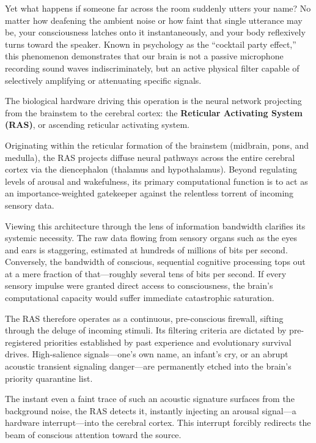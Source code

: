 Yet what happens if someone far across the room suddenly utters your name?
No matter how deafening the ambient noise or how faint that single utterance may be, your consciousness latches onto it instantaneously, and your body reflexively turns toward the speaker.
Known in psychology as the ``cocktail party effect,'' this phenomenon demonstrates that our brain is not a passive microphone recording sound waves indiscriminately, but an active physical filter capable of selectively amplifying or attenuating specific signals.

The biological hardware driving this operation is the neural network projecting from the brainstem to the cerebral cortex: the \textbf{Reticular Activating System (RAS)}, or ascending reticular activating system.

Originating within the reticular formation of the brainstem (midbrain, pons, and medulla), the RAS projects diffuse neural pathways across the entire cerebral cortex via the diencephalon (thalamus and hypothalamus).
Beyond regulating levels of arousal and wakefulness, its primary computational function is to act as an importance-weighted gatekeeper against the relentless torrent of incoming sensory data.

Viewing this architecture through the lens of information bandwidth clarifies its systemic necessity.
The raw data flowing from sensory organs such as the eyes and ears is staggering, estimated at hundreds of millions of bits per second.
Conversely, the bandwidth of conscious, sequential cognitive processing tops out at a mere fraction of that—roughly several tens of bits per second.
If every sensory impulse were granted direct access to consciousness, the brain's computational capacity would suffer immediate catastrophic saturation.

The RAS therefore operates as a continuous, pre-conscious firewall, sifting through the deluge of incoming stimuli.
Its filtering criteria are dictated by pre-registered priorities established by past experience and evolutionary survival drives.
High-salience signals—one's own name, an infant's cry, or an abrupt acoustic transient signaling danger—are permanently etched into the brain's priority quarantine list.

The instant even a faint trace of such an acoustic signature surfaces from the background noise, the RAS detects it, instantly injecting an arousal signal—a hardware interrupt—into the cerebral cortex.
This interrupt forcibly redirects the beam of conscious attention toward the source.


